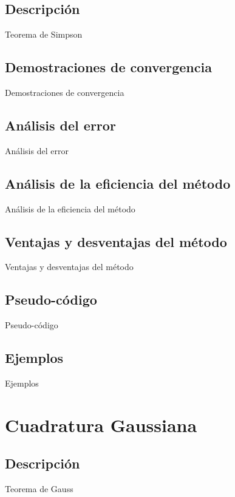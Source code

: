 \documentclass[journal,transmag]{IEEEtran}
\theoremstyle{mytheoremstyle}
\theoremstyle{mytheoremstyle}
\theoremstyle{myproblemstyle}
\begin{document}
\subsection{Descripción}
    Teorema de Simpson
\subsection{Demostraciones de convergencia}
    Demostraciones de convergencia
\subsection{Análisis del error}
\begin{lipsum}
    Análisis del error
\end{lipsum}
\subsection{Análisis de la eficiencia del método}
\begin{lipsum}
    Análisis de la eficiencia del método
\end{lipsum}
\subsection{Ventajas y desventajas del método}
\begin{lipsum}
    Ventajas y desventajas del método
\end{lipsum}
\subsection{Pseudo-código}
\begin{lipsum}
    Pseudo-código
\end{lipsum}
\subsection{Ejemplos}
\begin{lipsum}
    Ejemplos
\end{lipsum}
\section{Cuadratura Gaussiana}
\subsection{Descripción}
\begin{lipsum}
    Teorema de Gauss
\end{lipsum}
\end{document}
